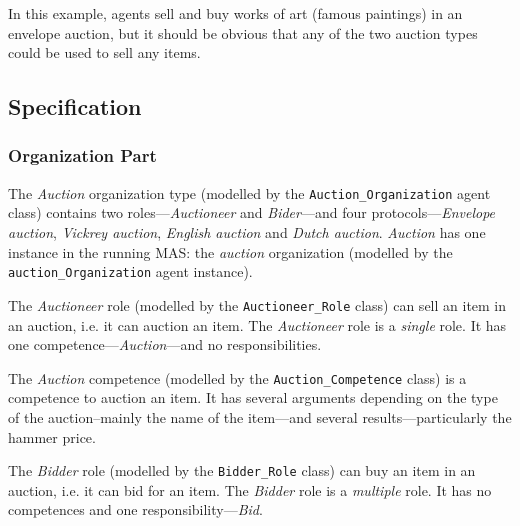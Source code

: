 
In this example, agents sell and buy works of art (famous paintings) in an envelope auction, but it should be obvious that any of the two auction types could be used to sell any items.

\subsection*{Specification}

\subsubsection*{Organization Part}

The \textit{Auction} organization type (modelled by the \texttt{Auction\_Organization} agent class) contains two roles---\textit{Auctioneer} and \textit{Bider}---and four protocols---\textit{Envelope auction}, \textit{Vickrey auction}, \textit{English auction} and \textit{Dutch auction}.
\textit{Auction} has one instance in the running MAS: the \textit{auction} organization (modelled by the \texttt{auction\_Organization} agent instance).

The \textit{Auctioneer} role (modelled by the \texttt{Auctioneer\_Role} class) can sell an item in an auction, i.e. it can auction an item.
The \textit{Auctioneer} role is a \textit{single} role.
It has one competence---\textit{Auction}---and no responsibilities.

The \textit{Auction} competence (modelled by the \texttt{Auction\_Competence} class) is a competence to auction an item.
It has several arguments depending on the type of the auction--mainly the name of the item---and several results---particularly the hammer price.

The \textit{Bidder} role (modelled by the \texttt{Bidder\_Role} class) can buy an item in an auction, i.e. it can bid for an item. 
The \textit{Bidder} role is a \textit{multiple} role.
It has no competences and one responsibility---\textit{Bid}.

